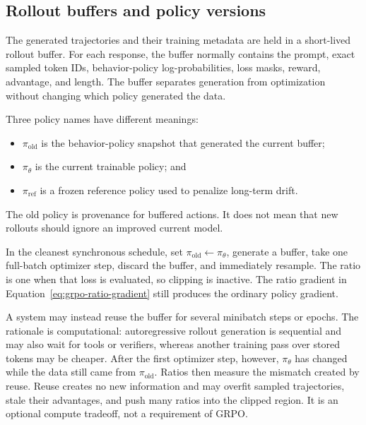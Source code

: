 \subsection{Rollout buffers and policy versions}

The generated trajectories and their training metadata are held in a short-lived rollout
buffer. For each response, the buffer normally contains the prompt, exact sampled token
IDs, behavior-policy log-probabilities, loss masks, reward, advantage, and length. The
buffer separates generation from optimization without changing which policy generated the
data.

Three policy names have different meanings:
\begin{itemize}
  \item $\pi_{\mathrm{old}}$ is the behavior-policy snapshot that generated the current
        buffer;
  \item $\pi_\theta$ is the current trainable policy; and
  \item $\pi_{\mathrm{ref}}$ is a frozen reference policy used to penalize long-term drift.
\end{itemize}
The old policy is provenance for buffered actions. It does not mean that new rollouts
should ignore an improved current model.

In the cleanest synchronous schedule, set
$\pi_{\mathrm{old}}\leftarrow\pi_\theta$, generate a buffer, take one full-batch optimizer
step, discard the buffer, and immediately resample. The ratio is one when that loss is
evaluated, so clipping is inactive. The ratio gradient in
Equation~\ref{eq:grpo-ratio-gradient} still produces the ordinary policy gradient.

A system may instead reuse the buffer for several minibatch steps or epochs. The rationale
is computational: autoregressive rollout generation is sequential and may also wait for
tools or verifiers, whereas another training pass over stored tokens may be cheaper. After
the first optimizer step, however, $\pi_\theta$ has changed while the data still came from
$\pi_{\mathrm{old}}$. Ratios then measure the mismatch created by reuse. Reuse creates no
new information and may overfit sampled trajectories, stale their advantages, and push
many ratios into the clipped region. It is an optional compute tradeoff, not a requirement
of GRPO.
